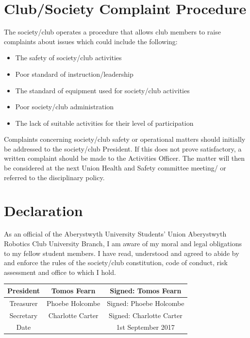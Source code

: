 \documentclass[a4paper,11pt]{article}
\begin{document}
\section{Club/Society Complaint Procedure}
The society/club operates a procedure that allows club members to raise complaints about issues which could include the following:
\begin{itemize}[nolistsep]
  \item The safety of society/club activities
  \item Poor standard of instruction/leadership
  \item The standard of equipment used for society/club activities
  \item Poor society/club administration
  \item The lack of suitable activities for their level of participation
\end{itemize}
Complaints concerning society/club safety or operational matters should initially be addressed to the society/club President. If this does not prove satisfactory, a written complaint should be made to the Activities Officer. The matter will then be considered at the next Union Health and Safety committee meeting/ or referred to the disciplinary policy.

\section{Declaration}
As an official of the Aberystwyth University Students’ Union Aberystwyth Robotics Club University Branch, I am aware of my moral and legal obligations to my fellow student members. I have read, understood and agreed to abide by and enforce the rules of the society/club constitution, code of conduct, risk assessment and office to which I hold.

\begin{center}
\begin{tabular}{ |c|c|c| } 
\hline
President & Tomos Fearn & Signed: Tomos Fearn \\
\hline
Treasurer & Phoebe Holcombe & Signed: Phoebe Holcombe \\ 
\hline
Secretary & Charlotte Carter & Signed: Charlotte Carter \\ 
\hline
Date &  & 1st September 2017 \\
\hline
\end{tabular}
\end{center}
\end{document}
